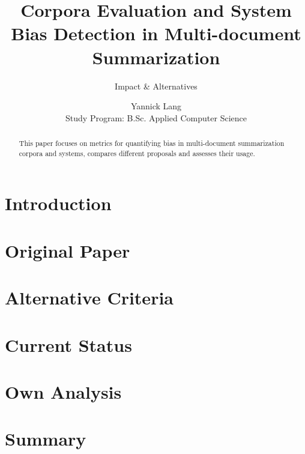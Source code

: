 \documentclass[runningheads]{llncs}
\begin{document}
\title{Corpora Evaluation and System Bias Detection in Multi-document Summarization}
\subtitle{Impact \& Alternatives}
\author{Yannick Lang \\
    \small Study Program: B.Sc. Applied Computer Science }

\maketitle              %


\begin{abstract}
    This paper focuses   on metrics for quantifying bias in multi-document summarization corpora and systems, compares different proposals and assesses their usage.
    
    
\end{abstract}

\section{Introduction}
\label{sec:introcution}


\section{Original Paper}
\label{sec:original-paper}


\section{Alternative Criteria}
\label{sec:alternative-criteria}


\section{Current Status}
\label{sec:current-status}


\section{Own Analysis}
\label{sec:analysis}


\section{Summary}
\label{sec:summary}





\end{document}
